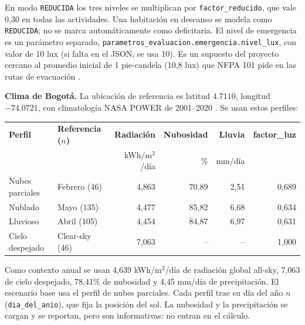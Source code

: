 \documentclass[12pt,a4paper]{article}
\newcommand{\estado}[1]{\texttt{#1}}
\newcommand{\codigo}[1]{\texttt{#1}}
\begin{document}
En modo \estado{REDUCIDA} los tres niveles se multiplican por \codigo{factor\_reducido}, que vale 0,30 en todas las actividades. Una habitación en descanso se modela como \estado{REDUCIDA}; no se marca automáticamente como deficitaria. El nivel de emergencia es un parámetro separado, \codigo{parametros\_evaluacion.emergencia.nivel\_lux}, con valor de 10 lux (si falta en el JSON, se usa 10). Es un supuesto del proyecto cercano al promedio inicial de 1 pie-candela (10,8 lux) que NFPA 101 pide en las rutas de evacuación \cite{nfpa101}.

\textbf{Clima de Bogotá.} La ubicación de referencia es latitud $4.7110$, longitud $-74.0721$, con climatología NASA POWER de 2001--2020 \cite{nasaPowerApi}. Se usan estos perfiles:

\begin{center}\small
\begin{tabular}{p{}p{}r r r r}
\toprule
\textbf{Perfil} & \textbf{Referencia ($n$)} & \textbf{Radiación} & \textbf{Nubosidad} & \textbf{Lluvia} & \textbf{factor\_luz}\\
 & & kWh/m$^2$/día & \% & mm/día & \\
\midrule
Nubes parciales & Febrero (46) & 4,863 & 70,89 & 2,51 & 0,689\\
Nublado & Mayo (135) & 4,477 & 85,82 & 6,68 & 0,634\\
Lluvioso & Abril (105) & 4,454 & 84,87 & 6,97 & 0,631\\
Cielo despejado & Clear-sky (46) & 7,063 & -- & -- & 1,000\\
\bottomrule
\end{tabular}
\end{center}

Como contexto anual se usan 4,639 kWh/m$^2$/día de radiación global all-sky, 7,063 de cielo despejado, 78,41\% de nubosidad y 4,45 mm/día de precipitación. El escenario base usa el perfil de nubes parciales. Cada perfil trae su día del año $n$ (\codigo{dia\_del\_anio}), que fija la posición del sol. La nubosidad y la precipitación se cargan y se reportan, pero son informativas: no entran en el cálculo.
\end{document}

